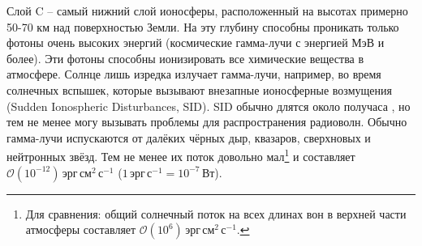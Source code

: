 Слой C -- самый нижний слой ионосферы, расположенный на высотах примерно 50-70 км над поверхностью Земли.
На эту глубину способны проникать только фотоны очень высоких энергий (космические гамма-лучи с энергией МэВ и более).
Эти фотоны способны ионизировать все химические вещества в атмосфере.
Солнце лишь изредка излучает гамма-лучи, например, во время солнечных вспышек, которые вызывают внезапные ионосферные возмущения (Sudden Ionospheric Disturbances, SID).
SID обычно длятся около получаса \cite{Rishbeth2003}, но тем не менее могу вызывать проблемы для распространения радиоволн.    
Обычно гамма-лучи испускаются от далёких чёрных дыр, квазаров, сверхновых и нейтронных звёзд.
Тем не менее их поток довольно мал\footnote{Для сравнения: общий солнечный поток на всех длинах вон в верхней части атмосферы составляет $\mathcal{O}(10^{6})\,\text{эрг}\,\text{см}^2\,\text{с}^{-1}$.} и составляет $\mathcal{O}(10^{-12})\,\text{эрг}\,\text{см}^2\,\text{с}^{-1}$ ($1\,\text{эрг}\,\text{с}^{-1}=10^{-7}\,\text{Вт}$).

